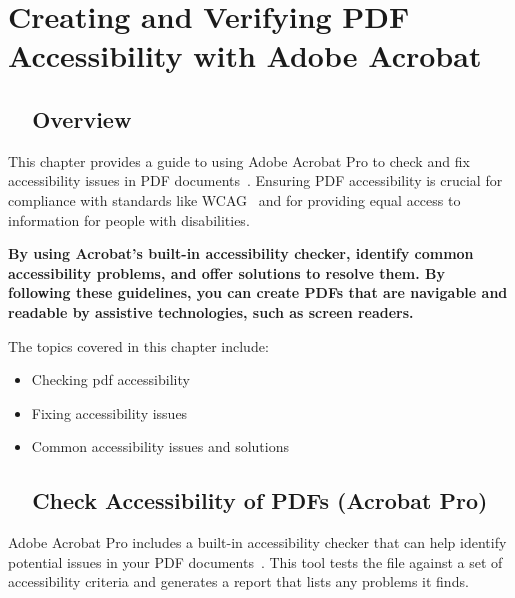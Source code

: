 \chapter{Creating and Verifying PDF Accessibility with Adobe Acrobat}
\label{cha:creating-and-verifying-pdf-accessibility-with-adobe-acrobat}

\section{~~Overview}
\label{sec:overview-16}

This chapter provides a guide to using Adobe Acrobat Pro to check and fix accessibility issues in PDF documents~\supercite{AdobeAccessGuide, AdobeHelpX}. Ensuring PDF accessibility is crucial for compliance with standards like WCAG~\supercite{WCAG21, WCAG22} and for providing equal access to information for people with disabilities.

\textbf{By using Acrobat's built-in accessibility checker, identify common accessibility problems, and offer solutions to resolve them. By following these guidelines, you can create PDFs that are navigable and readable by assistive technologies, such as screen readers.}

The topics covered in this chapter include:

\begin{itemize}
	\item Checking \gls{pdf} \gls{accessibility}
	\item Fixing accessibility issues
	\item Common accessibility issues and solutions
\end{itemize}

\section{~~Check Accessibility of PDFs (Acrobat Pro)}
\label{sec:check-accessibility-of-pdfs-acrobat-pro}

Adobe Acrobat Pro includes a built-in accessibility checker that can help identify potential issues in your PDF documents~\supercite{AdobeAccessGuide}. This tool tests the file against a set of accessibility criteria and generates a report that lists any problems it finds.

